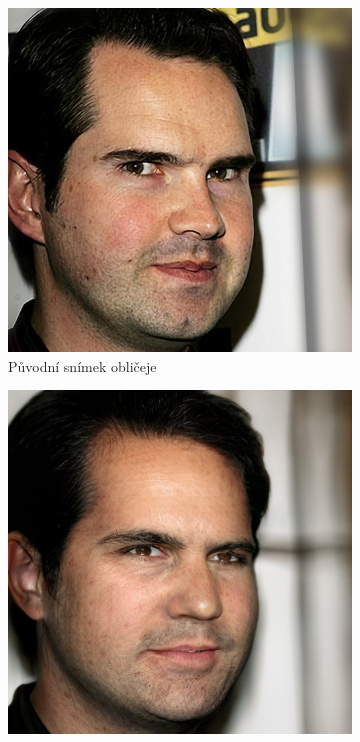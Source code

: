 \begin{figure}[H]
    \centering
    \begin{subfigure}{0.45\textwidth}
         \centering
         \includegraphics[width=1\textwidth]{obrazky-figures/real-090.jpg}
         \caption{Původní snímek obličeje}
         \label{fig:personal-090-real}
     \end{subfigure}
     \hfill
     \begin{subfigure}{0.45\textwidth}
         \centering
         \includegraphics[width=1\textwidth]{obrazky-figures/gen-090.jpeg}

\end{subfigure}
\end{figure}
